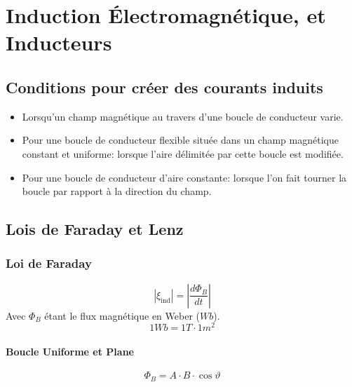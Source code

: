 \renewcommand\thesection{XII}
\section{Induction Électromagnétique, et Inducteurs}

\begin{multicols*}{2}
    \subsection{Conditions pour créer des courants induits}
    
    \begin{itemize}
        \item Lorsqu'un champ magnétique au travers d'une boucle de conducteur varie.
        \item Pour une boucle de conducteur flexible située dans un champ magnétique constant et uniforme: lorsque l'aire délimitée par cette boucle est modifiée.
        \item Pour une boucle de conducteur d'aire constante: lorsque l'on fait tourner la boucle par rapport à la direction du champ.
    \end{itemize}
    
    \subsection{Lois de Faraday et Lenz}
    
    \subsubsection{Loi de Faraday}
    
    \[ | \xi _{\text{ind}} | = \left| \frac{d \varPhi _B}{dt}\right| \]
    Avec $\varPhi_B$ étant le flux magnétique en Weber ($Wb$).
    \[1 Wb = 1 T \cdot 1 m^2 \]
    
    \paragraph{Boucle Uniforme et Plane}
    
    \[ \varPhi_B = A \cdot B \cdot \cos\vartheta \]
    \begin{center}
    \end{center}
    

\end{multicols*}
